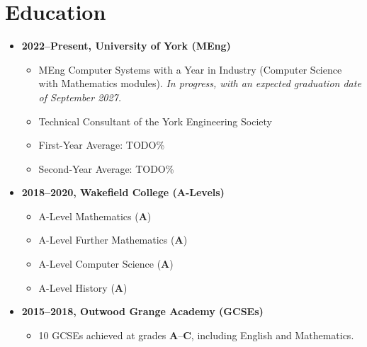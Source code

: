 \documentclass{article}
\begin{document}
\section{Education}
\begin{itemize}
    \item \textbf{2022--Present, University of York (MEng)}
    \begin{itemize}
        \item MEng Computer Systems with a Year in Industry (Computer Science
            with Mathematics modules). \emph{In progress, with an expected
            graduation date of September 2027.}
        \item Technical Consultant of the York Engineering Society
        \item First-Year Average: TODO\%
        \item Second-Year Average: TODO\%
    \end{itemize}
    \item \textbf{2018--2020, Wakefield College (A-Levels)}
    \begin{itemize}
        \item A-Level Mathematics (\textbf{A})
        \item A-Level Further Mathematics (\textbf{A})
        \item A-Level Computer Science (\textbf{A})
        \item A-Level History (\textbf{A})
    \end{itemize}
    \item \textbf{2015--2018, Outwood Grange Academy (GCSEs)}
    \begin{itemize}
        \item 10 GCSEs achieved at grades \textbf{A}--\textbf{C}, including
            English and Mathematics.
    \end{itemize}
\end{itemize}
\end{document}

